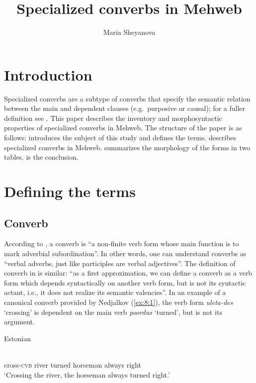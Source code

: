 ﻿\documentclass[output=paper]{langsci/langscibook}
\title{Specialized converbs in Mehweb}
\author{Maria Sheyanova\affiliation{National Research University Higher School of Economics, Faculty of Humanities, School of Linguistics, masha.shejanova@gmail.com}}
\begin{document}
\maketitle

\section{Introduction}

Specialized converbs are a subtype of converbs that specify the semantic
relation between the main and dependent clauses (e.g.\ purposive or
causal); for a fuller definition see .
This paper describes the
inventory and morphosyntactic properties of specialized converbs in
Mehweb. The structure of the paper is as follows:  introduces
the subject of this study and defines the terms.  describes
specialized converbs in Mehweb.  summarizes the morphology of
the forms in two tables.  is the conclusion.

\section{Defining the terms}\label{defining-the-terms}

\subsection{Converb}

According to \citet[3]{haspelmath1995a}, a converb is ``a non-finite verb
form whose main function is to mark adverbial subordination''. In
other words, one can understand converbs as ``verbal adverbs, just like
participles are verbal adjectives''. The definition of converb in
\citet{nedjalkov1995} is similar: ``as a first approximation, we can define a
converb as a verb form which depends syntactically on another verb form,
but is not its syntactic actant, i.e., it does not realize its semantic
valencies''. In an example of a canonical converb provided by Nedjalkov (\ref{ex:8:1}), the
verb form \emph{uleta-des} `crossing' is dependent on the main verb
\emph{poordus} `turned', but is not its argument.

\ea \label{ex:8:1} %
{\upshape Estonian \citep{nedjalkov1995}}

\\
cross-\textsc{cvb} river turned horseman always right\\
\glt `Crossing the river, the horseman always turned right.'
\z
\end{document}
